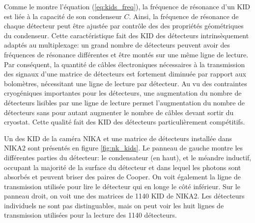 Comme le montre l'équation (\ref{eq:kids_freq}), la fréquence de résonance d'un KID est liée à la capacité de son condenseur $C$.
Ainsi, la fréquence de résonance de chaque détecteur peut être ajustée par contrôle des des propriétés géométriques du condenseur.
Cette caractéristique fait des KID des détecteurs intrinsèquement adaptés au multiplexage: un grand nombre de détecteurs peuvent avoir des fréquences de résonance différentes et être montés sur une même ligne de lecture.
Par conséquent, la quantité de câbles électroniques nécessaires à la transmission des signaux d'une matrice de détecteurs est fortement diminuée par rapport aux bolomètres, nécessitant une ligne de lecture par détecteur.
Au vu des contraintes cryogéniques importantes pour les détecteurs, une augmentation du nombre de détecteurs lisibles par une ligne de lecture permet l'augmentation du nombre de détecteurs sans pour autant augmenter le nombre de câbles devant sortir du cryostat.
Cette qualité fait des KID des détecteurs particulièrement compétitifs.

Un des KID de la caméra NIKA et une matrice de détecteurs installée dans NIKA2 sont présentés en figure \ref{fig:nk_kids}.
Le panneau de gauche montre les différentes parties du détecteur: le condensateur (en haut), et le méandre inductif, occupant la majorité de la surface du détecteur et dans lequel les photons sont absorbés et peuvent briser des paires de Cooper.
On voit également la ligne de transmission utilisée pour lire le détecteur qui en longe le côté inférieur.
Sur le panneau droit, on voit une des matrices de 1140 KID de NIKA2.
Les détecteurs individuels ne sont pas distinguables, mais on peut voir les huit lignes de transmission utilisées pour la lecture des 1140 détecteurs.

